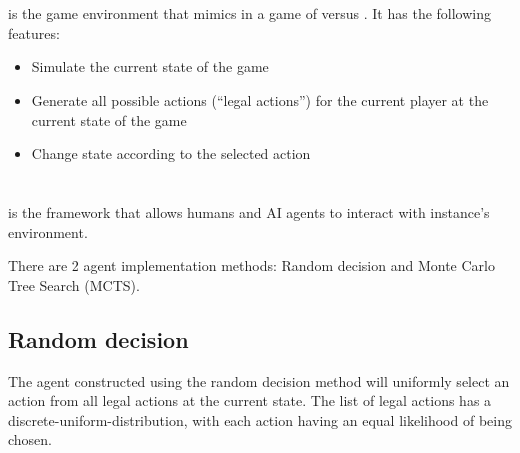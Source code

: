 \section{\RootOurs}
\RootOurs{} is the game environment that mimics \RootV{} in a game of \Marquise{} versus \Eyrie. It has the following features:
\begin{itemize}
  \item Simulate the current state of the game
  \item Generate all possible actions (``legal actions'') for the current player at the current state of the game
  \item Change state according to the selected action 
\end{itemize}

\section{\RootAI}
\RootAI{} is the framework that allows humans and AI agents to interact with \RootOurs{} instance's environment.

There are 2 agent implementation methods: Random decision and Monte Carlo Tree Search (MCTS).

\subsection{Random decision}
The agent constructed using the random decision method will uniformly select an action from all legal actions at the current state. The list of legal actions has a \gls{discrete-uniform-distribution}, with each action having an equal likelihood of being chosen. %


